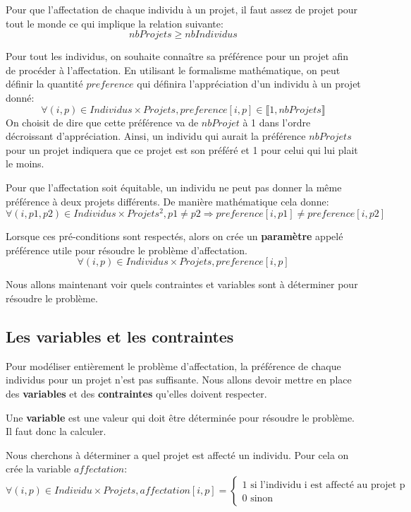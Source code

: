 \documentclass[final,poster]{polytech/polytech}
\begin{document}
Pour que l'affectation de chaque individu à un projet, il faut assez de projet pour tout le monde ce qui implique la relation suivante:
$$ nbProjets \geqslant nbIndividus$$

Pour tout les individus, on souhaite connaître sa préférence pour un projet afin de procéder à l'affectation. En utilisant le formalisme mathématique, on peut définir la quantité $preference$ qui définira l'appréciation d'un individu à un projet donné:
$$
\forall (i,p) \in Individus \times Projets,
preference[i,p] \in \llbracket 1, nbProjets \rrbracket
$$
On choisit de dire que cette préférence va de $nbProjet$ à 1 dans l'ordre décroissant d'appréciation. Ainsi, un individu qui aurait la préférence $nbProjets$ pour un projet indiquera que ce projet est son préféré et 1 pour celui qui lui plait le moins.

Pour que l'affectation soit équitable, un individu ne peut pas donner la même préférence à deux projets différents. De manière mathématique cela donne:
$$
\forall (i,p1,p2) \in Individus \times Projets^2 , p1 \neq p2 \Rightarrow preference[i,p1] \neq preference[i,p2]
$$

Lorsque ces pré-conditions sont respectés, alors on crée un \textbf{paramètre} appelé préférence utile pour résoudre le problème d'affectation.
$$
\forall (i,p) \in Individus \times Projets,
preference[i,p]
$$

Nous allons maintenant voir quels contraintes et variables sont à déterminer pour résoudre le problème.

\subsection{Les variables et les contraintes}

Pour modéliser entièrement le problème d'affectation, la préférence de chaque individus pour un projet n'est pas suffisante.
Nous allons devoir mettre en place des \textbf{ variables} et des \textbf{contraintes} qu'elles doivent respecter.

Une \textbf{variable} est une valeur qui doit être déterminée pour résoudre le problème. Il faut donc la calculer.

Nous cherchons à déterminer a quel projet est affecté un individu. Pour cela on crée la variable $affectation$:
$$
\forall (i,p) \in Individu\times Projets , affectation[i,p]=
\left\lbrace
\begin{array}{l}
1 \text{ si l'individu i est affecté au projet p} \\
0 \text{ sinon}
\end{array}
\right.
$$
\end{document}
